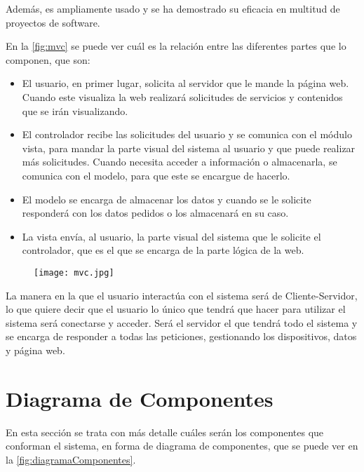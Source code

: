 Además, es ampliamente usado y se ha demostrado su eficacia en multitud de proyectos de software.
\pagebreak

En la \autoref{fig:mvc} se puede ver cuál es la relación entre las diferentes partes que lo componen, que son:
\begin{itemize}
	\item El usuario, en primer lugar, solicita al servidor que le mande la página web. Cuando este visualiza la web realizará solicitudes de servicios y contenidos que se irán visualizando.
	\item El controlador recibe las solicitudes del usuario y se comunica con el módulo vista, para mandar la parte visual del sistema al usuario y que puede realizar más solicitudes. Cuando necesita acceder a información o almacenarla, se comunica con el modelo, para que este se encargue de hacerlo.
	\item El modelo se encarga de almacenar los datos y cuando se le solicite responderá con los datos pedidos o los almacenará en su caso.
	\item La vista envía, al usuario, la parte visual del sistema que le solicite el controlador, que es el que se encarga de la parte lógica de la web.
\end{itemize}

\begin{figure}[H]
	{\texttt{[image: mvc.jpg]}}
\end{figure}

La manera en la que el usuario interactúa con el sistema será de Cliente-Servidor, lo que quiere decir que el usuario lo único que tendrá que hacer para utilizar el sistema será conectarse y acceder. Será el servidor el que tendrá todo el sistema y se encarga de responder a todas las peticiones, gestionando los dispositivos, datos y página web. 
\pagebreak

\section{Diagrama de Componentes}\label{sec:diagramaComponentes}
En esta sección se trata con más detalle cuáles serán los componentes que conforman el sistema, en forma de diagrama de componentes, que se puede ver en la \autoref{fig:diagramaComponentes}.

